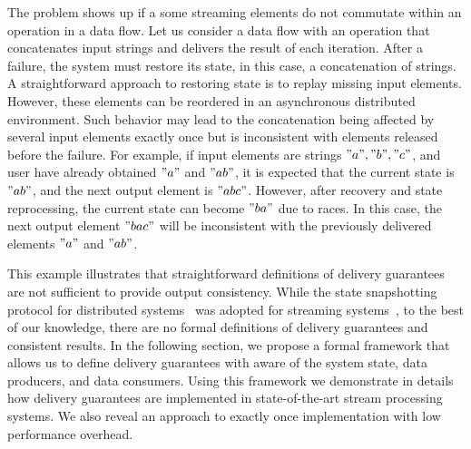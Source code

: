 The problem shows up if a some streaming elements do not commutate within an operation in a data flow. Let us consider a data flow with an operation that concatenates input strings and delivers the result of each iteration. After a failure, the system must restore its state, in this case, a concatenation of strings. A straightforward approach to restoring state is to replay missing input elements. However, these elements can be reordered in an asynchronous distributed environment. Such behavior may lead to the concatenation being affected by several input elements exactly once but is inconsistent with elements released before the failure. For example, if input elements are strings $"a","b","c"$, and user have already obtained $"a"$ and $"ab"$, it is expected that the current state is $"ab"$, and the next output element is $"abc"$. However, after recovery and state reprocessing, the current state can become $"ba"$ due to races. In this case, the next output element $"bac"$ will be inconsistent with the previously delivered elements $"a"$ and $"ab"$.  

This example illustrates that straightforward definitions of delivery guarantees are not sufficient to provide output consistency. While the state snapshotting protocol for distributed systems~\cite{Chandy:1985:DSD:214451.214456} was adopted for streaming systems~\cite{2015arXiv150608603C}, to the best of our knowledge, there are no formal definitions of delivery guarantees and consistent results. In the following section, we propose a formal framework that allows us to define delivery guarantees with aware of the system state, data producers, and data consumers. Using this framework we demonstrate in details how delivery guarantees are implemented in state-of-the-art stream processing systems. We also reveal an approach to exactly once implementation with low performance overhead. 